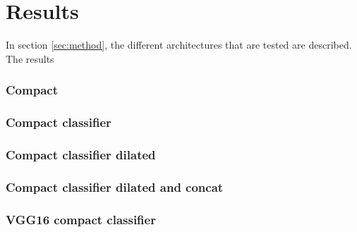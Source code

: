 \section{Results}\label{sec:results}

In section \ref{sec:method}, the different architectures that are tested are described. The results




\subsubsection{Compact}


\subsubsection{Compact classifier}


\subsubsection{Compact classifier dilated}


\subsubsection{Compact classifier dilated and concat}


\subsubsection{VGG16 compact classifier}

